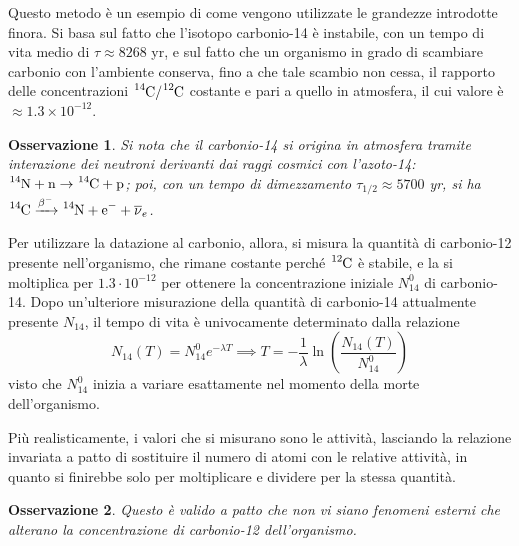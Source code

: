 \documentclass[11pt, a4paper]{scrartcl}
\theoremstyle{style}
\newtheorem{osservazione}{Osservazione}[section]
\theoremstyle{style1}
\numberwithin{equation}{subsection}
\begin{document}
Questo metodo \`e un esempio di come vengono utilizzate le grandezze introdotte finora. 
Si basa sul fatto che l'isotopo carbonio-14 \`e instabile, con un tempo di vita medio di $\tau  \approx 8268$ yr, e sul fatto che un organismo in grado di scambiare carbonio con l'ambiente conserva, fino a che tale scambio non cessa, il rapporto delle concentrazioni $\ce{^14C}/\ce{^12C}$ costante e pari a quello in atmosfera, il cui valore \`e $\approx 1.3 \times 10^{-12}$.
\begin{osservazione}
	Si nota che il carbonio-14 si origina in atmosfera tramite interazione dei neutroni derivanti dai raggi cosmici con l'azoto-14: $\ce{^{14}N + n} \to \ce{^{14}C + p}$; poi, con un tempo di dimezzamento $\tau _{1 / 2 } \approx 5700$ yr, si ha $\ce{^14C} \xrightarrow{ \beta ^- }  \ce{^{14}N + e- + \overline{\nu }_e}$. 
\end{osservazione}
\noindent Per utilizzare la datazione al carbonio, allora, si misura la quantit\`a di carbonio-12 presente nell'organismo, che rimane costante perch\'e $\ce{^{12}C}$ \`e stabile, e la si moltiplica per $1.3 \cdot 10^{-12}$ per ottenere la concentrazione iniziale $N^0_{14}$ di carbonio-14. 
Dopo un'ulteriore misurazione della quantit\`a di carbonio-14 attualmente presente $N_{14}$, il tempo di vita \`e univocamente determinato dalla relazione 
\begin{equation}
	N_{14}(T) = N^0_{14} e^{-\lambda T} \implies T = - \frac{1}{\lambda } \ln\left(\frac{N_{14} (T)}{ N_{14}^0}\right)  
\end{equation}
visto che $N^0_{14}$ inizia a variare esattamente nel momento della morte dell'organismo.

Pi\`u realisticamente, i valori che si misurano sono le attivit\`a, lasciando la relazione invariata a patto di sostituire il numero di atomi con le relative attivit\`a, in quanto si finirebbe solo per moltiplicare e dividere per la stessa quantit\`a.
\begin{osservazione}
Questo \`e valido a patto che non vi siano fenomeni esterni che alterano la concentrazione di carbonio-12 dell'organismo.
\end{osservazione}
\end{document}
